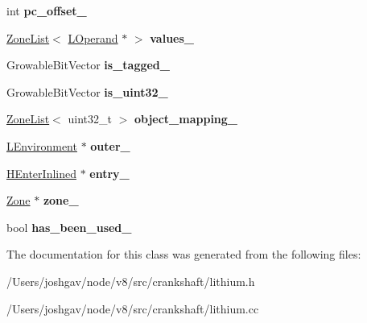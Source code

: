 \begin{DoxyCompactItemize}
\item 
int {\bfseries pc\+\_\+offset\+\_\+}\hypertarget{classv8_1_1internal_1_1_l_environment_a37ba11baef70a7b8eca386b18b397eea}{}\label{classv8_1_1internal_1_1_l_environment_a37ba11baef70a7b8eca386b18b397eea}

\item 
\hyperlink{classv8_1_1internal_1_1_zone_list}{Zone\+List}$<$ \hyperlink{classv8_1_1internal_1_1_l_operand}{L\+Operand} $\ast$ $>$ {\bfseries values\+\_\+}\hypertarget{classv8_1_1internal_1_1_l_environment_a0810ef9e223627b9163a9394ba1ca486}{}\label{classv8_1_1internal_1_1_l_environment_a0810ef9e223627b9163a9394ba1ca486}

\item 
Growable\+Bit\+Vector {\bfseries is\+\_\+tagged\+\_\+}\hypertarget{classv8_1_1internal_1_1_l_environment_a07f927c17dec194443da49b23d148e79}{}\label{classv8_1_1internal_1_1_l_environment_a07f927c17dec194443da49b23d148e79}

\item 
Growable\+Bit\+Vector {\bfseries is\+\_\+uint32\+\_\+}\hypertarget{classv8_1_1internal_1_1_l_environment_a1194f131f6dd0edf36e323fc9a4c9539}{}\label{classv8_1_1internal_1_1_l_environment_a1194f131f6dd0edf36e323fc9a4c9539}

\item 
\hyperlink{classv8_1_1internal_1_1_zone_list}{Zone\+List}$<$ uint32\+\_\+t $>$ {\bfseries object\+\_\+mapping\+\_\+}\hypertarget{classv8_1_1internal_1_1_l_environment_a0d463349cfc96ef9e2a3ed64218c1e54}{}\label{classv8_1_1internal_1_1_l_environment_a0d463349cfc96ef9e2a3ed64218c1e54}

\item 
\hyperlink{classv8_1_1internal_1_1_l_environment}{L\+Environment} $\ast$ {\bfseries outer\+\_\+}\hypertarget{classv8_1_1internal_1_1_l_environment_a69232b53d585e5fc6863716c256ffc04}{}\label{classv8_1_1internal_1_1_l_environment_a69232b53d585e5fc6863716c256ffc04}

\item 
\hyperlink{classv8_1_1internal_1_1_h_enter_inlined}{H\+Enter\+Inlined} $\ast$ {\bfseries entry\+\_\+}\hypertarget{classv8_1_1internal_1_1_l_environment_abf65cc5c32b49b5bb9d8c090131bed0a}{}\label{classv8_1_1internal_1_1_l_environment_abf65cc5c32b49b5bb9d8c090131bed0a}

\item 
\hyperlink{classv8_1_1internal_1_1_zone}{Zone} $\ast$ {\bfseries zone\+\_\+}\hypertarget{classv8_1_1internal_1_1_l_environment_aa9fc811a92e83751328276d7b4e435f9}{}\label{classv8_1_1internal_1_1_l_environment_aa9fc811a92e83751328276d7b4e435f9}

\item 
bool {\bfseries has\+\_\+been\+\_\+used\+\_\+}\hypertarget{classv8_1_1internal_1_1_l_environment_a4130b004564b0348050673df15f17997}{}\label{classv8_1_1internal_1_1_l_environment_a4130b004564b0348050673df15f17997}

\end{DoxyCompactItemize}


The documentation for this class was generated from the following files\+:\begin{DoxyCompactItemize}
\item 
/\+Users/joshgav/node/v8/src/crankshaft/lithium.\+h\item 
/\+Users/joshgav/node/v8/src/crankshaft/lithium.\+cc\end{DoxyCompactItemize}
